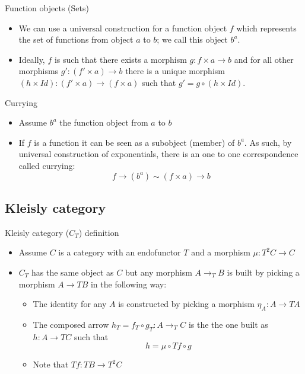 \documentclass[presentation]{beamer}
\begin{document}
\begin{frame}[label={sec:orgaf0ec9b}]{Function objects (Sets)}
\begin{itemize}
\item We can use a \alert{universal construction} for a function object \(f\) which represents the
set of functions from object \(a\) to \(b\); we call this object \(b^a\).
\item Ideally, \(f\) is such that there exists a morphism \(g: f \times a
      \rightarrow b\) and for all other morphisms \(g': (f' \times a) \rightarrow b\)
there is a unique morphism \((h \times Id): (f' \times a) \rightarrow (f
      \times a)\) such that \(g' = g \circ (h \times Id)\).
\end{itemize}
\end{frame}

\begin{frame}[label={sec:orge01450f}]{Currying}
\begin{itemize}
\item Assume \(b^a\) the function object from \(a\) to \(b\)
\item If \(f\) is a function it can be seen as a subobject (member) of \(b^a\). As
such, by universal construction of exponentials, there is an one to one
correspondence called \alert{currying}: $$f \rightarrow (b^a) \sim (f \times a) \rightarrow b$$
\end{itemize}
\end{frame}

\subsection{Kleisly category}
\label{sec:org1e04b8c}
\begin{frame}[label={sec:orgc26e6a5}]{Kleisly category (\(C_T\)) definition}
\begin{itemize}
\item Assume \(C\) is a category with an endofunctor \(T\) and a morphism \(\mu: T^2 C \rightarrow C\)
\item \(C_T\) has the same object as \(C\) but any morphism \(A \rightarrow_T B\) is
built by picking a morphism \(A \rightarrow T B\) in the following way:
\begin{itemize}
\item The \alert{identity} for any \(A\) is constructed by picking a morphism \(\eta_A: A
        \rightarrow T A\)
\item The composed arrow \(h_T = f_T \circ g_T : A \rightarrow_T C\) is the
the one built as \(h: A \rightarrow T C\) such that $$ h = \mu
        \circ T f \circ g$$
\item Note that \(T f: T B \rightarrow T^2 C\)
\end{itemize}
\end{itemize}
\end{frame}
\end{document}
